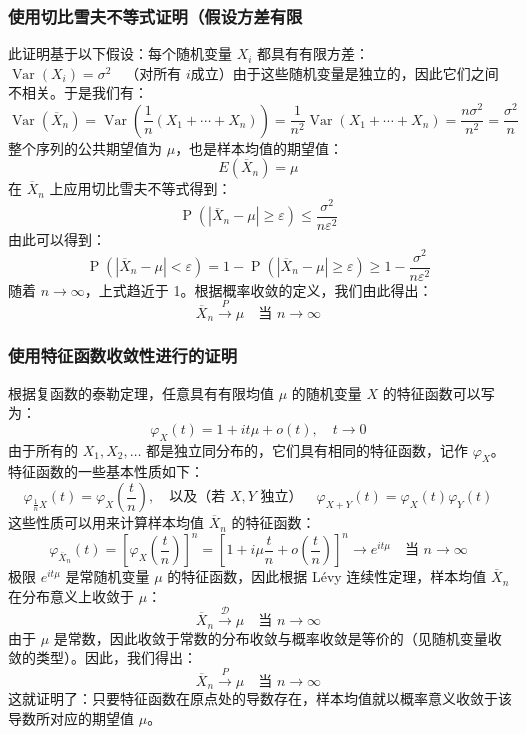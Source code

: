 \subsubsection{使用切比雪夫不等式证明（假设方差有限}
此证明基于以下假设：每个随机变量 $X_i$ 都具有有限方差：$\operatorname{Var}(X_i) = \sigma^2 \quad \text{（对所有 } i \text{成立）}$由于这些随机变量是独立的，因此它们之间不相关。于是我们有：
$$
\operatorname{Var}(\overline{X}_n) = \operatorname{Var}\left(\frac{1}{n}(X_1 + \cdots + X_n)\right) = \frac{1}{n^2} \operatorname{Var}(X_1 + \cdots + X_n) = \frac{n\sigma^2}{n^2} = \frac{\sigma^2}{n}~
$$
整个序列的公共期望值为 $\mu$，也是样本均值的期望值：
$$
E(\overline{X}_n) = \mu~
$$
在 $\overline{X}_n$ 上应用切比雪夫不等式得到：
$$
\operatorname{P}(|\overline{X}_n - \mu| \geq \varepsilon) \leq \frac{\sigma^2}{n\varepsilon^2}~
$$
由此可以得到：
$$
\operatorname{P}(|\overline{X}_n - \mu| < \varepsilon) = 1 - \operatorname{P}(|\overline{X}_n - \mu| \geq \varepsilon) \geq 1 - \frac{\sigma^2}{n\varepsilon^2}~
$$
随着 $n \to \infty$，上式趋近于 1。根据概率收敛的定义，我们由此得出：
$$
\overline{X}_n \overset{P}{\longrightarrow} \mu \quad \text{当 } n \to \infty~
$$
\subsubsection{使用特征函数收敛性进行的证明}
根据复函数的泰勒定理，任意具有有限均值 $\mu$ 的随机变量 $X$ 的特征函数可以写为：
$$
\varphi_X(t) = 1 + it\mu + o(t), \quad t \to 0~
$$
由于所有的 $X_1, X_2, \ldots$ 都是独立同分布的，它们具有相同的特征函数，记作 $\varphi_X$。
特征函数的一些基本性质如下：
$$
\varphi_{\frac{1}{n}X}(t) = \varphi_X\left(\frac{t}{n}\right),\quad \text{以及（若 } X, Y \text{ 独立）} \quad \varphi_{X+Y}(t) = \varphi_X(t)\varphi_Y(t)~
$$
这些性质可以用来计算样本均值 $\overline{X}_n$ 的特征函数：
$$
\varphi_{\overline{X}_n}(t) = \left[\varphi_X\left(\frac{t}{n}\right)\right]^n = \left[1 + i\mu \frac{t}{n} + o\left(\frac{t}{n}\right)\right]^n \longrightarrow e^{it\mu} \quad \text{当 } n \to \infty ~
$$
极限 $e^{it\mu}$ 是常随机变量 $\mu$ 的特征函数，因此根据 Lévy 连续性定理，样本均值 $\overline{X}_n$ 在分布意义上收敛于 $\mu$：
$$
\overline{X}_n \xrightarrow{\mathcal{D}} \mu \quad \text{当 } n \to \infty~
$$
由于 $\mu$ 是常数，因此收敛于常数的分布收敛与概率收敛是等价的（见随机变量收敛的类型）。因此，我们得出：
$$
\overline{X}_n \xrightarrow{P} \mu \quad \text{当 } n \to \infty~
$$
这就证明了：只要特征函数在原点处的导数存在，样本均值就以概率意义收敛于该导数所对应的期望值 $\mu$。
